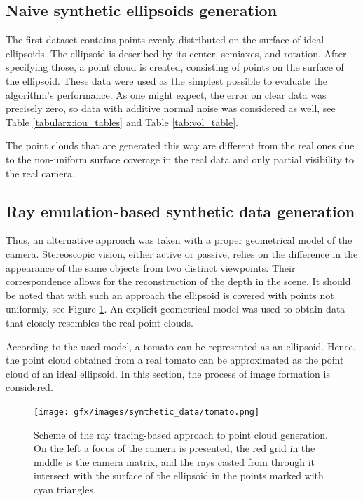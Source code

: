 \subsection{Naive synthetic ellipsoids generation}
\label{subsec_naive_data}

The first dataset contains points evenly distributed on the surface of ideal ellipsoids.
The ellipsoid is described by its center, semiaxes, and rotation.
After specifying those, a point cloud is created, consisting of points on the surface of the ellipsoid.
These data were used as the simplest possible to evaluate the algorithm's performance.
As one might expect, the error on clear data was precisely zero, so data with additive normal noise was considered as well, see Table \ref{tabularx:iou_tables} and Table \ref{tab:vol_table}.

The point clouds that are generated this way are different from the real ones due to the non-uniform surface coverage in the real data and only partial visibility to the real camera.

\subsection{Ray emulation-based synthetic data generation}
\label{subsec_ray_data}

Thus, an alternative approach was taken with a proper geometrical model of the camera.
Stereoscopic vision, either active or passive, relies on the difference in the appearance of the same objects from two distinct viewpoints.
Their correspondence allows for the reconstruction of the depth in the scene.
It should be noted that with such an approach the ellipsoid is covered with points not uniformly, see Figure \ref{fig_tomatoes_projection}.
An explicit geometrical model was used to obtain data that closely resembles the real point clouds.

\label{ell_line_int}
According to the used model, a tomato can be represented as an ellipsoid. 
Hence, the point cloud obtained from a real tomato can be approximated as the point cloud of an ideal ellipsoid. 
In this section, the process of image formation is considered. \\

\begin{figure}[!htb]
  \centering
      \texttt{[image: gfx/images/synthetic\_data/tomato.png]}
      \caption{Scheme of the ray tracing-based approach to point cloud generation. On the left a focus of the camera is presented, the red grid in the middle is the camera matrix, and the rays casted from through it intersect with the surface of the ellipsoid in the points marked with cyan triangles.}
      \label{fig_tomatoes_projection}
\end{figure}

